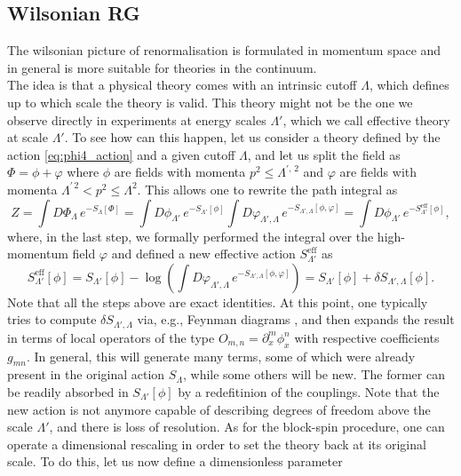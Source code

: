\subsection{Wilsonian RG}
\label{sec:wilson_rg}
The wilsonian picture of renormalisation \cite{WilsonRG1,WilsonRG2} is formulated in momentum space and in general is more suitable for theories in the continuum.\\
The idea is that a physical theory comes with an intrinsic cutoff $\Lambda$, which defines up to which scale the theory is valid. This theory might not be the one
we observe directly in experiments at energy scales $\Lambda'$, which we call effective theory at scale $\Lambda'$. To see how can this happen, let us consider a theory defined by the action \eqref{eq:phi4_action} and a given cutoff $\Lambda$, and let us split the field as $\Phi = \phi + \varphi$ where $\phi$ are fields with momenta $p^2 \leq \Lambda^{\prime, \, 2}$ and $\varphi$ are fields with momenta $\Lambda^{\prime \, 2} < p^2 \leq \Lambda^2$. This allows one to rewrite the path integral as
\begin{equation*}
    Z = \int D\Phi_\Lambda \, e^{-S_\Lambda[\Phi]} = \int D\phi_{\Lambda'} \, e^{-S_{\Lambda'}[\phi]} \int D\varphi_{\Lambda', \Lambda}  \, e^{-S_{\Lambda', \Lambda}[\phi, \varphi]} = \int D\phi_{\Lambda'} \, e^{-S_{\Lambda'}^\text{eff}[\phi]},
\end{equation*}
where, in the last step, we formally performed the integral over the high-momentum field $\varphi$ and defined a new effective action $S^\text{eff}_{\Lambda'}$ as
\begin{equation*}
    S_{\Lambda'}^\text{eff}[\phi] = S_{\Lambda'}[\phi] - \log\left( \int D\varphi_{\Lambda', \Lambda}  \, e^{-S_{\Lambda', \Lambda}[\phi, \varphi]}\right) =  S_{\Lambda'}[\phi] + \delta S_{\Lambda', \Lambda}[\phi].
\end{equation*}
Note that all the steps above are exact identities. At this point, one typically tries to compute $\delta S_{\Lambda', \Lambda}$ via, e.g., Feynman diagrams \cite{Peskin:1995ev}, and then expands the result in terms of local operators of the type $O_{m,n} = \partial^m_x\phi^n_x$ with respective coefficients $g_{mn}$. In general, this will generate many terms, some of which were already present in the original action $S_\Lambda$, while some others will be new. The former can be readily absorbed in $S_{\Lambda'}[\phi]$ by a redefitinion of the couplings. 
Note that the new action is not anymore capable of describing degrees of freedom above the scale $\Lambda'$, and there is loss of resolution. As for the block-spin procedure, one can operate a dimensional rescaling in order to set the theory back at its original scale. To do this, let us now define a dimensionless parameter 
